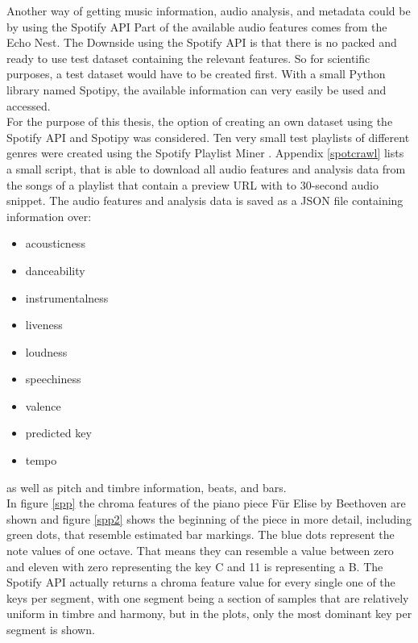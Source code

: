 Another way of getting music information, audio analysis, and metadata could be by using the Spotify API\cite{spotifyapi1}
Part of the available audio features comes from the Echo Nest\cite{echonest1}.
The Downside using the Spotify API is that there is no packed and ready to use test dataset containing the relevant features. So for scientific purposes, a test dataset would have to be created first. With a small Python library named Spotipy, the available information can very easily be used and accessed. \cite{spotipy1}\\
For the purpose of this thesis, the option of creating an own dataset using the Spotify API and Spotipy was considered. 
Ten very small test playlists of different genres were created using the Spotify Playlist Miner \cite{spotmin1}. 
Appendix \ref{spotcrawl} lists a small script, that is able to download all audio features and analysis data from the songs of a playlist that contain a preview URL with to 30-second audio snippet. The audio features and analysis data is saved as a JSON file containing information over:
\begin{itemize}
	\setlength\itemsep{-0.5em}
	\item acousticness
	\item danceability
	\item instrumentalness
	\item liveness
	\item loudness
	\item speechiness
	\item valence
	\item predicted key
	\item tempo 
\end{itemize}
as well as pitch and timbre information, beats, and bars.\\
In figure \ref{spp} the chroma features of the piano piece Für Elise by Beethoven are shown and figure \ref{spp2} shows the beginning of the piece in more detail, including green dots, that resemble estimated bar markings. The blue dots represent the note values of one octave. That means they can resemble a value between zero and eleven with zero representing the key C and 11 is representing a B. The Spotify API actually returns a chroma feature value for every single one of the keys per segment, with one segment being a section of samples that are relatively uniform in timbre and harmony, but in the plots, only the most dominant key per segment is shown. 

